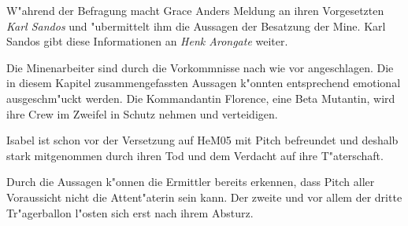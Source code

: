 W"ahrend der Befragung macht Grace Anders Meldung an ihren Vorgesetzten \emph{Karl Sandos} und "ubermittelt ihm die Aussagen der Besatzung der Mine. Karl Sandos gibt diese Informationen an \emph{Henk Arongate} weiter.

\begin{remarks}
	Die Minenarbeiter sind durch die Vorkommnisse nach wie vor angeschlagen. Die in diesem Kapitel zusammengefassten Aussagen k"onnten entsprechend emotional ausgeschm"uckt werden. Die Kommandantin Florence, eine Beta Mutantin, wird ihre Crew im Zweifel in Schutz nehmen und verteidigen.

	Isabel ist schon vor der Versetzung auf HeM05 mit Pitch befreundet und deshalb stark mitgenommen durch ihren Tod und dem Verdacht auf ihre T"aterschaft.

	Durch die Aussagen k"onnen die Ermittler bereits erkennen, dass Pitch aller Voraussicht nicht die Attent"aterin sein kann. Der zweite und vor allem der dritte Tr"agerballon l"osten sich erst nach ihrem Absturz.		
\end{remarks}
